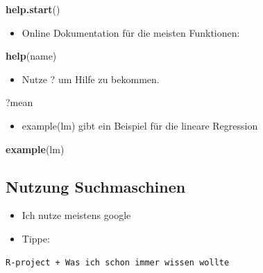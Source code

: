 \documentclass[]{article}
\newenvironment{Shaded}{\begin{snugshade}}{\end{snugshade}}
\newcommand{\KeywordTok}[1]{\textcolor[rgb]{0.13,0.29,0.53}{\textbf{{#1}}}}
\newcommand{\NormalTok}[1]{{#1}}
\providecommand{\tightlist}{%
  \setlength{\itemsep}{0pt}\setlength{\parskip}{0pt}}
\begin{document}
\begin{Shaded}
\begin{Highlighting}[]
\KeywordTok{help.start}\NormalTok{()}
\end{Highlighting}
\end{Shaded}

\begin{itemize}
\tightlist
\item
  Online Dokumentation für die meisten Funktionen:
\end{itemize}

\begin{Shaded}
\begin{Highlighting}[]
\KeywordTok{help}\NormalTok{(name)}
\end{Highlighting}
\end{Shaded}

\begin{itemize}
\tightlist
\item
  Nutze ? um Hilfe zu bekommen.
\end{itemize}

\begin{Shaded}
\begin{Highlighting}[]
\NormalTok{?mean}
\end{Highlighting}
\end{Shaded}

\begin{itemize}
\tightlist
\item
  example(lm) gibt ein Beispiel für die lineare Regression
\end{itemize}

\begin{Shaded}
\begin{Highlighting}[]
\KeywordTok{example}\NormalTok{(lm)}
\end{Highlighting}
\end{Shaded}

\subsection{Nutzung Suchmaschinen}\label{nutzung-suchmaschinen}

\begin{itemize}
\tightlist
\item
  Ich nutze meistens google
\item
  Tippe:
\end{itemize}

\begin{verbatim}
R-project + Was ich schon immer wissen wollte
\end{verbatim}
\end{document}
